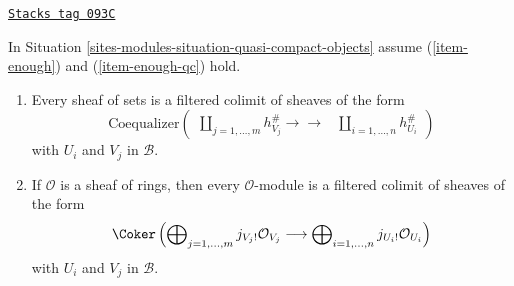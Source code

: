 \begin{lemma}
\label{sites-modules-lemma-module-filtered-colimit-constructibles}
\href{https://stacks.math.columbia.edu/tag/093C}{\texttt{Stacks tag 093C}}

In Situation \ref{sites-modules-situation-quasi-compact-objects} assume
(\ref{item-enough}) and (\ref{item-enough-qc}) hold.
\begin{enumerate}
\item Every sheaf of sets is a filtered colimit of sheaves of the form
\begin{equation}
\label{equation-towards-constructible-sets}
\text{Coequalizer}\left(
\begin{array}{cc}\coprod\nolimits_{j = 1, \ldots, m} h_{V_j}^\#
\longrightarrow\longrightarrow & \coprod\nolimits_{i = 1, \ldots, n} h_{U_i}^\#\end{array}
\right)
\end{equation}
with $U_i$ and $V_j$ in $\mathcal{B}$.
\item If $\mathcal{O}$ is a sheaf of rings, then every $\mathcal{O}$-module
is a filtered colimit of sheaves of the form
\begin{equation}
\label{equation-towards-constructible}
\Coker\left(
\bigoplus\nolimits_{j = 1, \ldots, m} j_{V_j!}\mathcal{O}_{V_j}
\longrightarrow
\bigoplus\nolimits_{i = 1, \ldots, n} j_{U_i!}\mathcal{O}_{U_i}
\right)
\end{equation}
with $U_i$ and $V_j$ in $\mathcal{B}$.
\end{enumerate}
\end{lemma}

